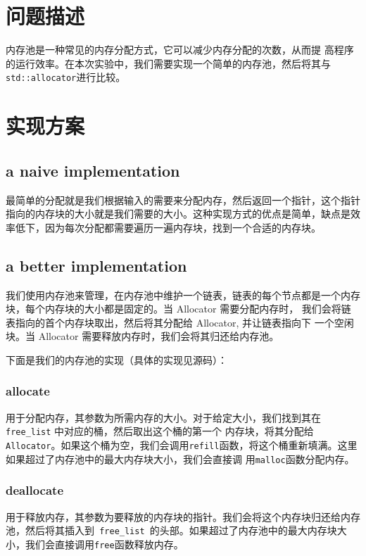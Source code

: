 \documentclass[12pt,hyperref,a4paper,UTF8]{ctexart}
\begin{document}
\cover


\thispagestyle{empty} %

\newpage

\newpage
\section{问题描述}
内存池是一种常见的内存分配方式，它可以减少内存分配的次数，从而提
高程序的运行效率。在本次实验中，我们需要实现一个简单的内存池，然后将其与
\verb|std::allocator|进行比较。

\section{实现方案}
\subsection{a naive implementation}
最简单的分配就是我们根据输入的需要来分配内存，然后返回一个指针，这个指针指向的内存块的大小就是我们需要的大小。这种实现方式的优点是简单，缺点是效率低下，因为每次分配都需要遍历一遍内存块，找到一个合适的内存块。

\subsection{a better implementation}
我们使用内存池来管理，在内存池中维护一个链表，链表的每个节点都是一个内存块，每个内存块的大小都是固定的。当 Allocator 需要分配内存时，
我们会将链表指向的首个内存块取出，然后将其分配给 Allocator, 并让链表指向下
一个空闲块。当 Allocator 需要释放内存时，我们会将其归还给内存池。

下面是我们的内存池的实现（具体的实现见源码）：

\subsubsection{allocate}
用于分配内存，其参数为所需内存的大小。对于给定大小，我们找到其在\verb|free_list| 中对应的桶，然后取出这个桶的第一个
内存块，将其分配给 \verb|Allocator|。如果这个桶为空，我们会调用\verb|refill|函数，将这个桶重新填满。这里如果超过了内存池中的最大内存块大小，我们会直接调
用\verb|malloc|函数分配内存。

\subsubsection{deallocate}
用于释放内存，其参数为要释放的内存块的指针。我们会将这个内存块归还给内存池，然后将其插入到\verb| free_list |的头部。如果超过了内存池中的最大内存块大小，我们会直接调用\verb|free|函数释放内存。
\end{document}
